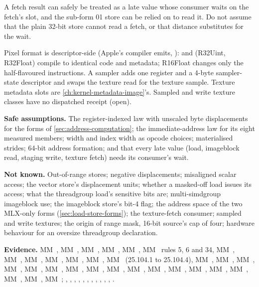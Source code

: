 A fetch result can safely be treated as a late value whose consumer waits on the fetch's slot, and the sub-form 01
store can be relied on to read it. Do not assume that the plain 32-bit store cannot read a fetch, or that distance
substitutes for the wait.

Pixel format is descriptor-side (Apple's compiler emits, ):
 and  (R32Uint, R32Float) compile to identical code and metadata; R16Float changes
only the half-flavoured instructions. A sampler adds one register and a 4-byte sampler-state descriptor and swaps the
texture read for the texture sample. Texture metadata slots are \cref{ch:kernel-metadata-image}'s. Sampled and write texture
classes have no dispatched receipt (open).

\textbf{Safe assumptions.} The register-indexed law with unscaled byte displacements for the forms of
\cref{sec:address-computation}; the immediate-address law for its eight measured members; width and index width as
opcode choices; materialised strides; 64-bit address formation; and that every late value (load, imageblock read,
staging write, texture fetch) needs its consumer's wait.

\textbf{Not known.} Out-of-range stores; negative displacements; misaligned scalar access; the vector store's
displacement units; whether a masked-off load issues its access; what the threadgroup load's sensitive bits are;
multi-simdgroup imageblock use; the imageblock store's bit-4 flag; the address space of the two MLX-only forms
(\cref{sec:load-store-forms}); the texture-fetch consumer; sampled and write textures; the origin of range mask, 16-bit
source's cap of four; hardware behaviour for an oversize threadgroup declaration.

\textbf{Evidence.} MM~, MM~, MM~, MM~, MM~, MM~ rules 5, 6 and 34, MM~, MM~, MM~, MM~, MM~,
MM~, MM~ (25.104.1 to 25.104.4), MM~, MM~, MM~, MM~, MM~, MM~,
MM~, MM~, MM~, MM~, MM~, MM~, MM~, MM~, MM~, MM~,
MM~, MM~; , , ,
, , ,
, , ,
, , .
